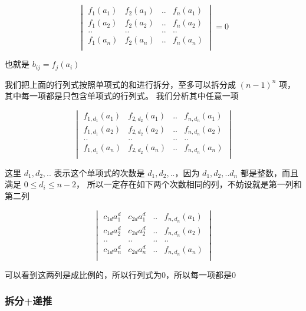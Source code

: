 \documentclass[12pt,a4paper]{ctexart}
\begin{document}
\[
\begin{vmatrix}
    f_1(a_1) & f_2(a_1) & .. & f_n(a_1) \\
    f_1(a_2) & f_2(a_2) & .. & f_n(a_2) \\
    .. & .. & .. & .. \\
    f_1(a_n) & f_2(a_n) & .. & f_n(a_n) \\
\end{vmatrix} = 0
\]

也就是 $b_{ij} = f_j(a_i)$

我们把上面的行列式按照单项式的和进行拆分，至多可以拆分成 $(n-1)^n$ 项，其中每一项都是只包含单项式的行列式。
我们分析其中任意一项

\[
\begin{vmatrix}
    f_{1,d_1}(a_1) & f_{2,d_2}(a_1) & .. & f_{n,d_n}(a_1) \\
    f_{1,d_1}(a_2) & f_{2,d_2}(a_2) & .. & f_{n,d_n}(a_2) \\
    .. & .. & .. & .. \\
    f_{1,d_1}(a_n) & f_{2,d_2}(a_n) & .. & f_{n,d_n}(a_n) \\
\end{vmatrix} 
\]

这里 $d_1, d_2,..$ 表示这个单项式的次数是 $d_1,d_2, ..$，因为 $d_1,d_2,..d_n$ 都是整数，而且满足 $0 \le d_i \le n-2$，
所以一定存在如下两个次数相同的列，不妨设就是第一列和第二列

\[
\begin{vmatrix}
    c_{1d}a_1^d & c_{2d}a_1^d & .. & f_{n,d_n}(a_1) \\
    c_{1d}a_2^d & c_{2d}a_2^d & .. & f_{n,d_n}(a_2) \\
    .. & .. & .. & .. \\
    c_{1d}a_n^d & c_{2d}a_n^d & .. & f_{n,d_n}(a_n) \\
\end{vmatrix} 
\]

可以看到这两列是成比例的，所以行列式为0，所以每一项都是0

\subsubsection{拆分+递推}
\end{document}
